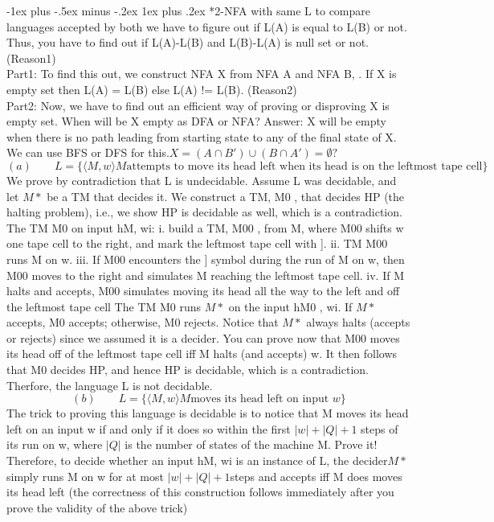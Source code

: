 \documentclass[10pt,landscape]{article}
\makeatletter
\theoremstyle{plain}%
\theoremstyle{definition}
\theoremstyle{remark}
\renewcommand{\subsubsection}{\@startsection{subsubsection}{3}{0mm}%
                                {-1ex plus -.5ex minus -.2ex}%
                                {1ex plus .2ex}%
                                {\normalfont\small\bfseries}}
\makeatother
\begin{document}
\begin{multicols}{3}
\subsubsection*{2-NFA with same L}
to compare languages accepted by both we have to figure out if L(A) is equal to L(B) or not.
Thus, you have to find out if L(A)-L(B) and L(B)-L(A) is null set or not. (Reason1)\\
Part1:
To find this out, we construct NFA X from NFA A and NFA B, .
If X is empty set then L(A) = L(B) else L(A) != L(B). (Reason2)
\\
Part2:
Now, we have to find out an efficient way of proving or disproving X is empty set. When will be X empty as DFA or NFA? Answer: X will be empty when there is no path leading from starting state to any of the final state of X. We can use BFS or DFS for this.$X=(A\cap B')\cup (B\cap A')=\emptyset ?$
\[ (a)\qquad L =  \{ \langle M,w \rangle M \text{attempts to move its head left when its head is on the leftmost tape cell}\}
\]
We prove by contradiction that L is undecidable. Assume L was decidable, and let $M*$ be a TM
that decides it. We construct a TM, M0
, that decides HP (the halting problem), i.e., we show
HP is decidable as well, which is a contradiction.
The TM M0 on input hM, wi:
i. build a TM, M00
, from M, where M00 shifts w one tape cell to the right, and mark the
leftmost tape cell with ].
ii. TM M00 runs M on w.
iii. If M00 encounters the ] symbol during the run of M on w, then M00 moves to the right and
simulates M reaching the leftmost tape cell.
iv. If M halts and accepts, M00 simulates moving its head all the way to the left and off the
leftmost tape cell
The TM M0
runs $M*$ on the input hM0
, wi. If $M*$
accepts, M0
accepts; otherwise, M0
rejects.
Notice that $M*$
always halts (accepts or rejects) since we assumed it is a decider.
You can prove now that M00 moves its head off of the leftmost tape cell iff M halts (and accepts)
w. It then follows that M0 decides HP, and hence HP is decidable, which is a contradiction.
Therfore, the language L is not decidable.
\[ (b)\qquad L =  \{ \langle M,w \rangle M \text{moves its head left on input }w\}
\]
The trick to proving this language is decidable is to notice that M moves its head left on an input
w if and only if it does so within the first $|w| + |Q| + 1 $ steps of its run on w, where $|Q|$ is the
number of states of the machine M. Prove it!
Therefore, to decide whether an input hM, wi is an instance of L, the decider$M*$
simply runs M
on w for at most $|w| + |Q| + 1 $steps and accepts iff M does moves its head left (the correctness
of this construction follows immediately after you prove the validity of the above trick)


\end{multicols}
\end{document}
